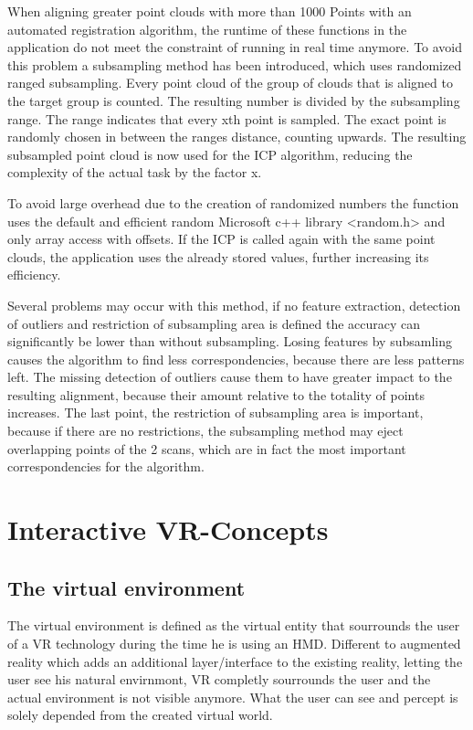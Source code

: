 \documentclass[hyperref,english,bachelorofscience,bibnum]{cgvpub}
\begin{document}
When aligning greater point clouds with more than 1000 Points with an automated registration algorithm, the runtime of these functions in the application do not meet the constraint of running in real time anymore. 
To avoid this problem a subsampling method has been introduced, which uses randomized ranged subsampling. Every point cloud of the group of clouds that is aligned to the target group is counted. The resulting number is divided by the subsampling range. The range indicates that every xth point is sampled. The exact point is randomly chosen in between the ranges distance, counting upwards. The resulting subsampled point cloud is now used for the ICP algorithm, reducing the complexity of the actual task by the factor x.

To avoid large overhead due to the creation of randomized numbers the function uses the default and efficient random Microsoft c++ library <random.h> and only array access with offsets. If the ICP is called again with the same point clouds, the application uses the already stored values, further increasing its efficiency.

Several problems may occur with this method, if no feature extraction, detection of outliers and restriction of subsampling area is defined the accuracy can significantly be lower than without subsampling. Losing features by subsamling causes the algorithm to find less correspondencies, because there are less patterns left. The missing detection of outliers cause them to have greater impact to the resulting alignment, because their amount relative to the totality of points increases. The last point, the restriction of subsampling area is important, because if there are no restrictions, the subsampling method may eject overlapping points of the 2 scans, which are in fact the most important correspondencies for the algorithm. 

\chapter{Interactive VR-Concepts}


\section{The virtual environment}

The virtual environment is defined as the virtual entity that sourrounds the user of a VR technology during the time he is using an HMD. Different to augmented reality which adds an additional layer/interface to the existing reality, letting the user see his natural envirnmont, VR completly sourrounds the user and the actual environment is not visible anymore. What the user can see and percept is solely depended from the created virtual world\cite{Milgram1995}.
\end{document}
